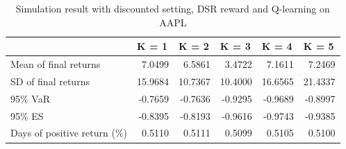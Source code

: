 \documentclass{article}
\begin{document}
\begin{table}[H]
\centering
\begin{tabular}{|l|r|r|r|r|r|} 
\hline
                             & \multicolumn{1}{l|}{K = 1} & \multicolumn{1}{l|}{K = 2} & \multicolumn{1}{l|}{K = 3} & \multicolumn{1}{l|}{K = 4} & \multicolumn{1}{l|}{K = 5}  \\ 
\hline
Mean of final returns        & 7.0499                     & 6.5861                     & 3.4722                     & 7.1611                     & 7.2469                      \\ 
\hline
SD of final returns          & 15.9684                    & 10.7367                    & 10.4000                    & 16.6565                    & 21.4337                     \\ 
\hline
95\% VaR                     & -0.7659                    & -0.7636                    & -0.9295                    & -0.9689                    & -0.8997                     \\ 
\hline
95\% ES                      & -0.8395                    & -0.8193                    & -0.9616                    & -0.9743                    & -0.9385                     \\ 
\hline
Days of positive return (\%) & 0.5110                     & 0.5111                     & 0.5099                     & 0.5105                     & 0.5100                      \\
\hline
\end{tabular}
\caption{Simulation result with discounted setting, DSR reward and Q-learning on AAPL}
\label{table6}
\end{table}
\end{document}
